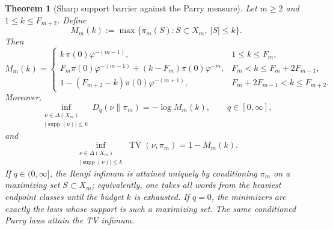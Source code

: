 \documentclass[11pt,letterpaper]{article}
\numberwithin{equation}{section}
\theoremstyle{plain}
\newtheorem{theorem}{Theorem}[section]
\theoremstyle{definition}
\theoremstyle{remark}
\DeclareMathOperator{\TV}{TV}
\DeclareMathOperator{\supp}{supp}
\begin{document}
\begin{theorem}[Sharp support barrier against the Parry measure]\label{thm:parry-support-barrier}
Let \(m\ge 2\) and \(1\le k\le F_{m+2}\). Define
\[
M_m(k):=\max\{\pi_m(S):S\subset X_m,\ |S|\le k\}.
\]
Then
\[
M_m(k)=
\begin{cases}
k\,\pi(0)\varphi^{-(m-1)},
& 1\le k\le F_m,\\[0.4em]
F_m\pi(0)\varphi^{-(m-1)}+(k-F_m)\pi(0)\varphi^{-m},
& F_m<k\le F_m+2F_{m-1},\\[0.4em]
1-(F_{m+2}-k)\pi(0)\varphi^{-(m+1)},
& F_m+2F_{m-1}<k\le F_{m+2}.
\end{cases}
\]
Moreover,
\[
\inf_{\substack{\nu\in\Delta(X_m)\\ |\supp(\nu)|\le k}}D_q(\nu\|\pi_m)
=
-\log M_m(k),
\qquad q\in[0,\infty],
\]
and
\[
\inf_{\substack{\nu\in\Delta(X_m)\\ |\supp(\nu)|\le k}}\TV(\nu,\pi_m)
=
1-M_m(k).
\]
If \(q\in(0,\infty]\), the Renyi infimum is attained uniquely by conditioning
\(\pi_m\) on a maximizing set \(S\subset X_m\); equivalently, one takes all
words from the heaviest endpoint classes until the budget \(k\) is exhausted.
If \(q=0\), the minimizers are exactly the laws whose support is such a
maximizing set. The same conditioned Parry laws attain the TV infimum.
\end{theorem}
\end{document}
